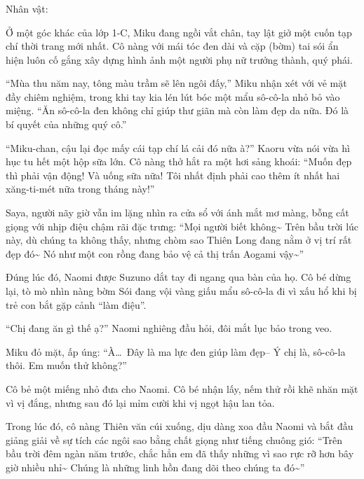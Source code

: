 \documentclass[../main.tex]{subfiles}
\begin{document}
\newpage

\subsubsection*{\label{ep-ER7}}
\begin{center}{\caviar Nhân vật:   }\end{center}

Ở một góc khác của lớp 1-C, Miku đang ngồi vắt chân, tay lật giở một cuốn tạp chí thời trang mới nhất. Cô nàng với mái tóc đen dài và cặp (bờm) tai sói ẩn hiện luôn cố gắng xây dựng hình ảnh một người phụ nữ trưởng thành, quý phái.

``Mùa thu năm nay, tông màu trầm sẽ lên ngôi đấy,'' Miku nhận xét với vẻ mặt đầy chiêm nghiệm, trong khi tay kia lén lút bóc một mẩu sô-cô-la nhỏ bỏ vào miệng. ``Ăn sô-cô-la đen không chỉ giúp thư giãn mà còn làm đẹp da nữa. Đó là bí quyết của những quý cô.''

``Miku-chan, cậu lại đọc mấy cái tạp chí lá cải đó nữa à?''  Kaoru vừa nói vừa hì hục tu hết một hộp sữa lớn. Cô nàng thở hắt ra một hơi sảng khoái: ``Muốn đẹp thì phải vận động! Và uống sữa nữa! Tôi nhất định phải cao thêm ít nhất hai xăng-ti-mét nữa trong tháng này!''

Saya, người nãy giờ vẫn im lặng nhìn ra cửa sổ với ánh mắt mơ màng, bỗng cất giọng với nhịp điệu chậm rãi đặc trưng: ``Mọi người biết không\~{} Trên bầu trời lúc này, dù chúng ta không thấy, nhưng chòm sao Thiên Long đang nằm ở vị trí rất đẹp đó\~{} Nó như một con rồng đang bảo vệ cả thị trấn Aogami vậy\~{}''

Đúng lúc đó, Naomi được Suzuno dắt tay đi ngang qua bàn của họ. Cô bé dừng lại, tò mò nhìn nàng bờm Sói đang vội vàng giấu mẩu sô-cô-la đi vì xấu hổ khi bị trẻ con bắt gặp cảnh ``làm điệu''.

``Chị đang ăn gì thế ạ?'' Naomi nghiêng đầu hỏi, đôi mắt lục bảo trong veo.

Miku đỏ mặt, ấp úng: ``À\dots\ Đây là ma lực đen giúp làm đẹp-- Ý chị là, sô-cô-la thôi. Em muốn thử không?''

Cô bẻ một miếng nhỏ đưa cho Naomi. Cô bé nhận lấy, nếm thử rồi khẽ nhăn mặt vì vị đắng, nhưng sau đó lại mỉm cười khi vị ngọt hậu lan tỏa.

Trong lúc đó, cô nàng Thiên văn cúi xuống, dịu dàng xoa đầu Naomi và bắt đầu giảng giải về sự tích các ngôi sao bằng chất giọng như tiếng chuông gió: ``Trên bầu trời đêm ngàn năm trước, chắc hẳn em đã thấy những vì sao rực rỡ hơn bây giờ nhiều nhỉ\~{} Chúng là những linh hồn đang dõi theo chúng ta đó\~{}''
\end{document}
